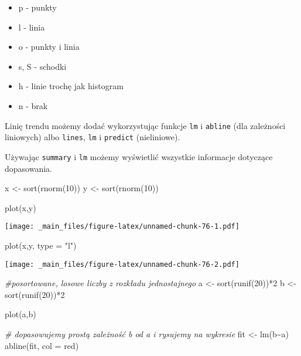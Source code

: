 \documentclass[
]{book}
\newenvironment{Shaded}{\begin{snugshade}}{\end{snugshade}}
\newcommand{\AttributeTok}[1]{\textcolor[rgb]{0.77,0.63,0.00}{#1}}
\newcommand{\CommentTok}[1]{\textcolor[rgb]{0.56,0.35,0.01}{\textit{#1}}}
\newcommand{\DecValTok}[1]{\textcolor[rgb]{0.00,0.00,0.81}{#1}}
\newcommand{\FunctionTok}[1]{\textcolor[rgb]{0.00,0.00,0.00}{#1}}
\newcommand{\NormalTok}[1]{#1}
\newcommand{\OtherTok}[1]{\textcolor[rgb]{0.56,0.35,0.01}{#1}}
\newcommand{\SpecialCharTok}[1]{\textcolor[rgb]{0.00,0.00,0.00}{#1}}
\newcommand{\StringTok}[1]{\textcolor[rgb]{0.31,0.60,0.02}{#1}}
\begin{document}
\begin{itemize}
\item
  p - punkty
\item
  l - linia
\item
  o - punkty i linia
\item
  s, S - schodki
\item
  h - linie trochę jak histogram
\item
  n - brak
\end{itemize}

Linię trendu możemy dodać wykorzystując funkcje \texttt{lm} i \texttt{abline} (dla zależności liniowych) albo \texttt{lines}, \texttt{lm} i \texttt{predict} (nieliniowe).

Używając \texttt{summary} i \texttt{lm} możemy wyświetlić wszystkie informacje dotyczące dopasowania.

\begin{Shaded}
\begin{Highlighting}[]
\NormalTok{x }\OtherTok{\textless{}{-}} \FunctionTok{sort}\NormalTok{(}\FunctionTok{rnorm}\NormalTok{(}\DecValTok{10}\NormalTok{))}
\NormalTok{y }\OtherTok{\textless{}{-}} \FunctionTok{sort}\NormalTok{(}\FunctionTok{rnorm}\NormalTok{(}\DecValTok{10}\NormalTok{))}

\FunctionTok{plot}\NormalTok{(x,y)}
\end{Highlighting}
\end{Shaded}

\texttt{[image: \_main\_files/figure-latex/unnamed-chunk-76-1.pdf]}

\begin{Shaded}
\begin{Highlighting}[]
\FunctionTok{plot}\NormalTok{(x,y, }\AttributeTok{type =} \StringTok{"l"}\NormalTok{)}
\end{Highlighting}
\end{Shaded}

\texttt{[image: \_main\_files/figure-latex/unnamed-chunk-76-2.pdf]}

\begin{Shaded}
\begin{Highlighting}[]
\CommentTok{\#posortowane, losowe liczby z rozkładu jednostajnego}
\NormalTok{a }\OtherTok{\textless{}{-}} \FunctionTok{sort}\NormalTok{(}\FunctionTok{runif}\NormalTok{(}\DecValTok{20}\NormalTok{))}\SpecialCharTok{*}\DecValTok{2}
\NormalTok{b }\OtherTok{\textless{}{-}} \FunctionTok{sort}\NormalTok{(}\FunctionTok{runif}\NormalTok{(}\DecValTok{20}\NormalTok{))}\SpecialCharTok{*}\DecValTok{2}

\FunctionTok{plot}\NormalTok{(a,b)}

\CommentTok{\# dopasowujemy prostą zależność b od a i rysujemy na wykresie}
\NormalTok{fit }\OtherTok{\textless{}{-}} \FunctionTok{lm}\NormalTok{(b}\SpecialCharTok{\textasciitilde{}}\NormalTok{a)}
\FunctionTok{abline}\NormalTok{(fit, }\AttributeTok{col =} \StringTok{\textquotesingle{}red\textquotesingle{}}\NormalTok{)}
\end{Highlighting}
\end{Shaded}
\end{document}
